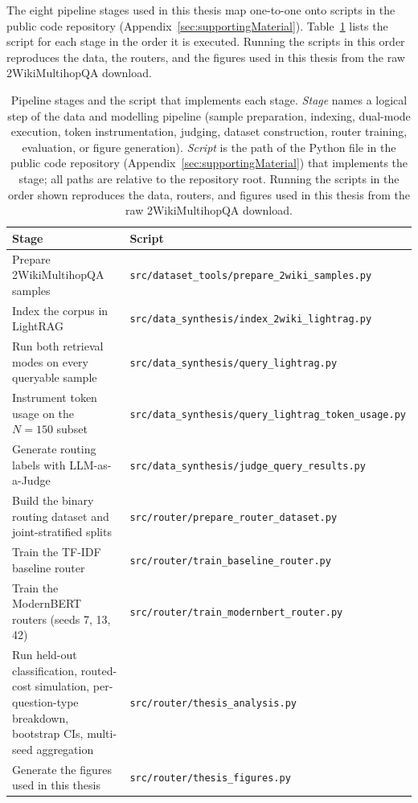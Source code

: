 \documentclass[english, bibtex]{kththesis}               %
\numberwithin{listing}{chapter}
\begin{document}
The eight pipeline stages used in this thesis map one-to-one onto scripts in the public code repository (Appendix~\ref{sec:supportingMaterial}). Table~\ref{tab:pipelineScripts} lists the script for each stage in the order it is executed. Running the scripts in this order reproduces the data, the routers, and the figures used in this thesis from the raw 2WikiMultihopQA download.

\begin{table}[!ht]
\centering
\caption{Pipeline stages and the script that implements each stage. \emph{Stage} names a logical step of the data and modelling pipeline (sample preparation, indexing, dual-mode execution, token instrumentation, judging, dataset construction, router training, evaluation, or figure generation). \emph{Script} is the path of the Python file in the public code repository (Appendix~\ref{sec:supportingMaterial}) that implements the stage; all paths are relative to the repository root. Running the scripts in the order shown reproduces the data, routers, and figures used in this thesis from the raw 2WikiMultihopQA download.}
\label{tab:pipelineScripts}
\begin{tabularx}{\textwidth}{p{}|X}
\textbf{Stage} & \textbf{Script} \\
\hline
Prepare 2WikiMultihopQA samples & \texttt{src/dataset\_tools/prepare\_2wiki\_samples.py} \\
Index the corpus in LightRAG & \texttt{src/data\_synthesis/index\_2wiki\_lightrag.py} \\
Run both retrieval modes on every queryable sample & \texttt{src/data\_synthesis/query\_lightrag.py} \\
Instrument token usage on the \(N = 150\) subset & \texttt{src/data\_synthesis/query\_lightrag\_token\_usage.py} \\
Generate routing labels with LLM-as-a-Judge & \texttt{src/data\_synthesis/judge\_query\_results.py} \\
Build the binary routing dataset and joint-stratified splits & \texttt{src/router/prepare\_router\_dataset.py} \\
Train the TF-IDF baseline router & \texttt{src/router/train\_baseline\_router.py} \\
Train the ModernBERT routers (seeds 7, 13, 42) & \texttt{src/router/train\_modernbert\_router.py} \\
Run held-out classification, routed-cost simulation, per-question-type breakdown, bootstrap CIs, multi-seed aggregation & \texttt{src/router/thesis\_analysis.py} \\
Generate the figures used in this thesis & \texttt{src/router/thesis\_figures.py} \\
\end{tabularx}
\end{table}
\end{document}
